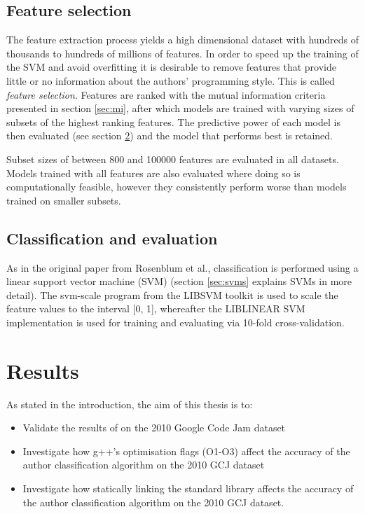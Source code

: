 \documentclass[a4paper,11pt]{kth-mag}
\begin{document}
\section{Feature selection}
The feature extraction process yields a high dimensional dataset with hundreds
of thousands to hundreds of millions of features. In order to speed up the
training of the SVM and avoid overfitting it is desirable to remove features
that provide little or no information about the authors’ programming style.
This is called \emph{feature selection}. Features are ranked with the mutual
information criteria presented in section \ref{sec:mi}, after which models are
trained with varying sizes of subsets of the highest ranking features. The
predictive power of each model is then evaluated (see section
\ref{sec:c-e}) and the model that performs best is retained.

Subset sizes of between 800 and 100000 features are evaluated in all datasets.
Models trained with all features are also evaluated where doing so is
computationally feasible, however they consistently perform worse than models
trained on smaller subsets.

\section{Classification and evaluation}
\label{sec:c-e}
As in the original paper from Rosenblum et al., classification is performed
using a linear support vector machine (SVM) (section \ref{sec:svms} explains
SVMs in more detail). The svm-scale program from the LIBSVM toolkit is used
\parencite{chang2011libsvm} to scale the feature values to the interval [0, 1],
whereafter the LIBLINEAR SVM implementation \parencite{fan2008liblinear} is
used for training and evaluating via 10-fold cross-validation.

\chapter{Results}
As stated in the introduction, the aim of this thesis is to:
\begin{itemize}
\item Validate the results of \parencite{rosenblum2011wrote} on the 2010 Google
      Code Jam dataset
\item Investigate how g++’s optimisation flags (O1-O3) affect the accuracy of
      the author classification algorithm on the 2010 GCJ dataset
\item Investigate how statically linking the standard library affects the
      accuracy of the author classification algorithm on the 2010 GCJ dataset.
\end{itemize}
\end{document}
